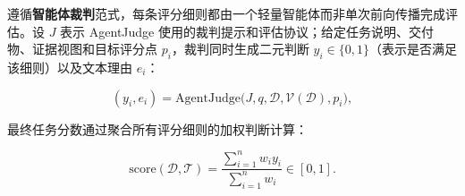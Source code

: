 遵循\textbf{智能体裁判}范式，每条评分细则都由一个轻量智能体而非单次前向传播完成评估。设 $J$ 表示 AgentJudge 使用的裁判提示和评估协议；给定任务说明、交付物、证据视图和目标评分点 $p_i$，裁判同时生成二元判断 $y_i\in\{0,1\}$（表示是否满足该细则）以及文本理由 $e_i$：

\begin{equation}
(y_i,e_i) = \mathrm{AgentJudge}\big(J, q,
\mathcal{D}, \mathcal{V}(\mathcal{D}), p_i\big),
\label{eq}
\end{equation}

最终任务分数通过聚合所有评分细则的加权判断计算：

\begin{equation}
\mathrm{score}(\mathcal{D},\mathcal{T})
= \frac{\sum_{i=1}^{n} w_i y_i}{\sum_{i=1}^{n} w_i}
\in [0,1].
\label{eq2}
\end{equation}

\FloatBarrier
